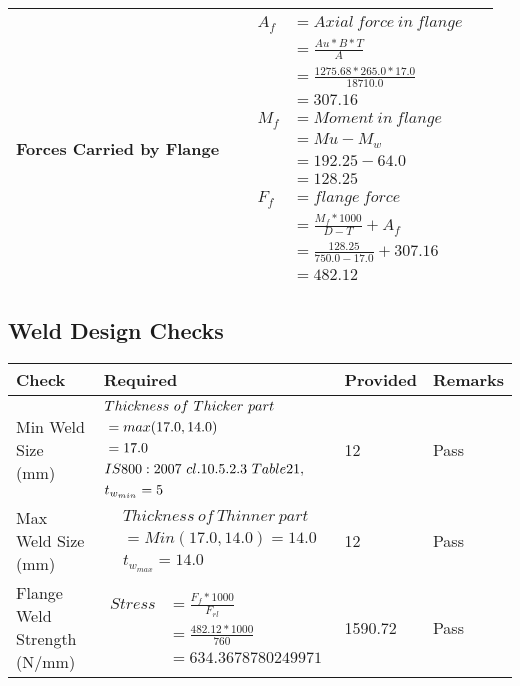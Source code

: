 \documentclass{article}%
\begin{document}
\begin{longtable}{|p{4cm}|p{5cm}|p{5.5cm}|p{1.5cm}|}
\hline%
Forces Carried by Flange&&$\begin{aligned} A_f&= Axial~force~ in ~flange  \\ &= \frac{Au * B *T}{A} \\ &= \frac{1275.68 * 265.0*17.0}{18710.0} \\ &=307.16\\ M_f& =Moment~ in~ flange \\  & = Mu-M_w\\ &= 192.25-64.0\\ &=128.25\\  F_f& =flange~force  \\ & = \frac{M_f *1000}{D-T} + A_f \\ &= \frac{128.25}{750.0-17.0} +307.16 \\ &=482.12\end{aligned}$&\\%
\hline%
\end{longtable}

%
\newpage%
\subsection{Weld Design Checks}%
\label{subsec:WeldDesignChecks}%
\renewcommand{\arraystretch}{1.2}%
\begin{longtable}{|p{4cm}|p{5cm}|p{5.5cm}|p{1.5cm}|}%
\hline%
\rowcolor{OsdagGreen}%
Check&Required&Provided&Remarks\\%
\hline%
\endhead%
\hline%
Min Weld Size (mm)&$\begin{aligned} &Thickness~of~Thicker~part\\ \noindent &=max(17.0,14.0)\\ &=17.0\\ &IS800:2007~cl.10.5.2.3~Table 21,\\  &t_{w_{min}}=5\end{aligned}$&12&Pass\\%
\hline%
Max Weld Size (mm)&$\begin{aligned} & Thickness~of~Thinner~part\\ &=Min(17.0,14.0)=14.0\\ &t_{w_{max}} =14.0\end{aligned}$&12&Pass\\%
\hline%
Flange Weld Strength (N/mm)&$\begin{aligned} Stress &= \frac{F_f*1000}{F_{rl}}\\  &= \frac{482.12*1000}{760}\\ &= 634.3678780249971\end{aligned}$&1590.72&Pass\\%
\hline%
\end{longtable}
\end{document}

